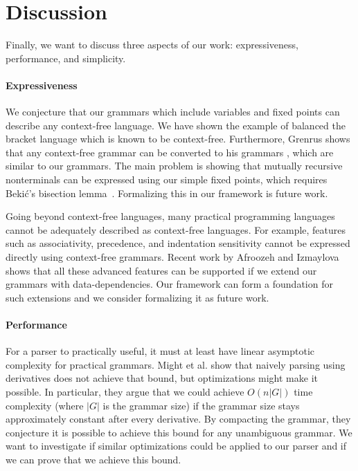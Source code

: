 \begin{code}[hide]%
\>[0]\AgdaSpace{}%
\AgdaSpace{}%
\<%
\end{code}

\section{Discussion}

Finally, we want to discuss three aspects of our work: expressiveness, performance, and simplicity.

\paragraph{Expressiveness} We conjecture that our grammars which include variables and fixed points can describe any context-free language. We have shown the example of balanced the bracket language which is known to be context-free. Furthermore, Grenrus shows that any context-free grammar can be converted to his grammars \cite{fix-ing-regular-expressions}, which are similar to our grammars. The main problem is showing that mutually recursive nonterminals can be expressed using our simple fixed points, which requires Beki\'c's bisection lemma~\cite{Bekic1984}. Formalizing this in our framework is future work.

Going beyond context-free languages, many practical programming languages cannot be adequately described as context-free languages. For example, features such as associativity, precedence, and indentation sensitivity cannot be expressed directly using context-free grammars. Recent work by Afroozeh and Izmaylova~\cite{one-parser-to-rule-them-all} shows that all these advanced features can be supported if we extend our grammars with data-dependencies. Our framework can form a foundation for such extensions and we consider formalizing it as future work.

\paragraph{Performance}
For a parser to practically useful, it must at least have linear asymptotic complexity for practical grammars. Might et al. \cite{parsing-with-derivatives} show that naively parsing using derivatives does not achieve that bound, but optimizations might make it possible. In particular, they argue that we could achieve $O(n|G|)$ time complexity (where $|G|$ is the grammar size) if the grammar size stays approximately constant after every derivative. By compacting the grammar, they conjecture it is possible to achieve this bound for any unambiguous grammar. We want to investigate if similar optimizations could be applied to our parser and if we can prove that we achieve this bound.

